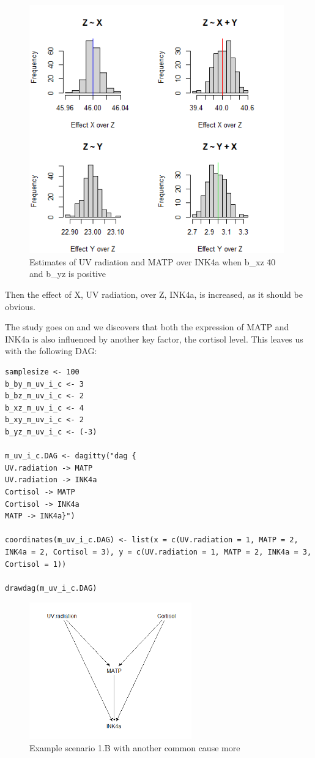 \documentclass{article}
\begin{document}
\begin{figure}[h]
\caption{Estimates of UV radiation and MATP over INK4a when b\_xz \= 40 and b\_yz is positive}
\includegraphics[width=11cm]{hist40neg.png}
\centering
\end{figure}
\newpage
Then the effect of X, UV radiation, over Z, INK4a, is increased, as it should be obvious. \par
The study goes on and we discovers that both the expression of MATP and INK4a is also influenced by another key factor, the cortisol level. This leaves us with the following DAG:\par

\begin{lstlisting}
samplesize <- 100
b_by_m_uv_i_c <- 3
b_bz_m_uv_i_c <- 2
b_xz_m_uv_i_c <- 4
b_xy_m_uv_i_c <- 2
b_yz_m_uv_i_c <- (-3)

m_uv_i_c.DAG <- dagitty("dag {
UV.radiation -> MATP
UV.radiation -> INK4a
Cortisol -> MATP
Cortisol -> INK4a
MATP -> INK4a}")

coordinates(m_uv_i_c.DAG) <- list(x = c(UV.radiation = 1, MATP = 2, INK4a = 2, Cortisol = 3), y = c(UV.radiation = 1, MATP = 2, INK4a = 3, Cortisol = 1))

drawdag(m_uv_i_c.DAG)
\end{lstlisting}

\begin{figure}[h]
\caption{Example scenario 1.B with another common cause more}
\includegraphics[width=7cm]{mUVicor.png}
\centering
\end{figure}
\end{document}
